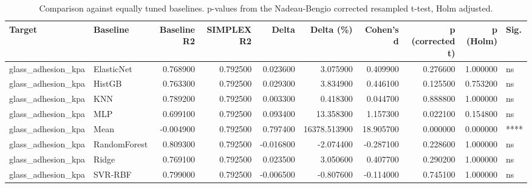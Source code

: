 \begin{table}
\caption{Comparison against equally tuned baselines. p-values from the Nadeau-Bengio corrected resampled t-test, Holm adjusted.}
\label{tab:baseline_comparison}
\begin{tabular}{llrrrrrrrl}
\toprule
Target & Baseline & Baseline R2 & SIMPLEX R2 & Delta & Delta (\%) & Cohen's d & p (corrected t) & p (Holm) & Sig. \\
\midrule
glass\_adhesion\_kpa & ElasticNet & 0.768900 & 0.792500 & 0.023600 & 3.075900 & 0.409900 & 0.276600 & 1.000000 & ns \\
glass\_adhesion\_kpa & HistGB & 0.763300 & 0.792500 & 0.029300 & 3.834900 & 0.446100 & 0.125500 & 0.753200 & ns \\
glass\_adhesion\_kpa & KNN & 0.789200 & 0.792500 & 0.003300 & 0.418300 & 0.044700 & 0.888800 & 1.000000 & ns \\
glass\_adhesion\_kpa & MLP & 0.699100 & 0.792500 & 0.093400 & 13.358300 & 1.157300 & 0.022100 & 0.154800 & ns \\
glass\_adhesion\_kpa & Mean & -0.004900 & 0.792500 & 0.797400 & 16378.513900 & 18.905700 & 0.000000 & 0.000000 & **** \\
glass\_adhesion\_kpa & RandomForest & 0.809300 & 0.792500 & -0.016800 & -2.074400 & -0.287100 & 0.228600 & 1.000000 & ns \\
glass\_adhesion\_kpa & Ridge & 0.769100 & 0.792500 & 0.023500 & 3.050600 & 0.407700 & 0.290200 & 1.000000 & ns \\
glass\_adhesion\_kpa & SVR-RBF & 0.799000 & 0.792500 & -0.006500 & -0.807600 & -0.114000 & 0.745100 & 1.000000 & ns \\
\bottomrule
\end{tabular}
\end{table}
